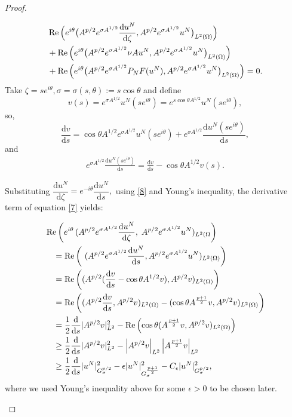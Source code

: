 \documentclass[12pt]{article}
\theoremstyle{plain}
\theoremstyle{remark}
\newcommand{\dd}{\mathrm{d}}
\begin{document}
\begin{proof}
\begin{enumerate}
\begin{align}
& \operatorname{Re}\Big( e^{i\theta}
\big( A^{p/2} e^{\sigma A^{1/2}} \frac{\dd u^N}{\dd\zeta},
A^{p/2} e^{\sigma A^{1/2}} u^N \big)_{L^2(\Omega)} \Big) \notag \\
& + \operatorname{Re}\Big( e^{i\theta}
\big( A^{p/2} e^{\sigma A^{1/2}} \nu A u^N,
A^{p/2} e^{\sigma A^{1/2}} u^N \big)_{L^2(\Omega)} \Big) \notag \\
& + \operatorname{Re}\Big ( e^{i\theta}
\big( A^{p/2} e^{\sigma A^{1/2}} P_N F(u^N),
A^{p/2} e^{\sigma A^{1/2}} u^N \big)_{L^2(\Omega)} \Big)
= 0.\label{7}
\end{align}
Take  \(\zeta=s e^{i\theta}, \sigma=\sigma(s,\theta):=s\cos\theta\) and define
\[v(s) = e^{\sigma A^{1/2}} u^N(s e^{i\theta})=e^{s\cos\theta A^{1/2}} u^N(s e^{i\theta}),
\]
so, \[
\frac{\dd v}{\dd s} = \cos\theta A^{1/2} e^{\sigma A^{1/2}} u^N(s e^{i\theta}) + e^{\sigma A^{1/2}} \frac{\dd u^N(s e^{i\theta})}{\dd s},
\]
and 
\begin{align}
    e^{\sigma A^{1/2}} \frac{\dd u^N(s e^{i\theta})}{\dd s} = \frac{\dd v}{\dd s} -  \cos\theta A^{1/2} v(s).\label{8}
\end{align}

Substituting \(\dfrac{\mathrm{d} u^N}{\mathrm{d} \zeta} = e^{-i\theta} \dfrac{\mathrm{d} u^N}{\mathrm{d} s},\) using \eqref{8} and Young's inequality, the derivative term of equation \eqref{7} yields: 

\begin{align}
   & \operatorname{Re}\left(
  e^{i\theta}\,
  (
    A^{p/2} e^{\sigma A^{1/2}} \frac{\dd u^N}{\dd\zeta},\;
    A^{p/2} e^{\sigma A^{1/2}} u^N)
  _{L^2(\Omega}\right)\notag \\
&\quad= \operatorname{Re}\left(\ (A^{p/2} e^{\sigma A^{1/2}} \frac{\dd u^N}{\dd s} , A^{p/2} e^{\sigma A^{1/2}} u^N)_ {L^2(\Omega)} \right)\notag \\
&\quad= \operatorname{Re}\left((A^{p/2} (\frac{\dd v}{\dd s} - \cos\theta A^{1/2} v), A^{p/2}  v) _ {L^2(\Omega)}\right)\notag \\
&\quad= \operatorname{Re}\left((A^{p/2} \frac{\dd v}{\dd s}, A^{p/2}  v) _ {L^2(\Omega)}- ( \cos\theta A^{\frac{p+1}{2}} v,A^{p/2}  v) _ {L^2(\Omega)}\right)
\notag \\
&\quad= \frac{1}{2} \frac{\dd}{\dd s} |A^{p/2} v|^2_{L^2}- \operatorname{Re}\left(\cos \theta (A^{\frac{p+1}{2}} v,A^{p/2}  v) _ {L^2(\Omega)}\right)\notag\\
&\quad \geq \frac{1}{2} \frac{\dd}{\dd s} |A^{p/2} v|^2_{L^2}-  \left| A^{p/2} v \right|_{L^2} \left| A^{\frac{p+1}{2}} v \right|_{L^2}
\notag\\
&\quad \geq
 \frac{1}{2} \frac{\dd}{\dd s} |u^N|^2_{G_\sigma^{p/2}}-\epsilon
    |u^N|^2_{G_\sigma^{\frac{p+1}{2}}}-C_\epsilon | u^N|^2_{G_\sigma^{p/2}},\label{9}
\end{align} 
\vspace{0.5cm}
where we used Young's inequality above for some $\epsilon >0$ to be chosen later.
 

\end{enumerate}
\end{proof}
\end{document}
